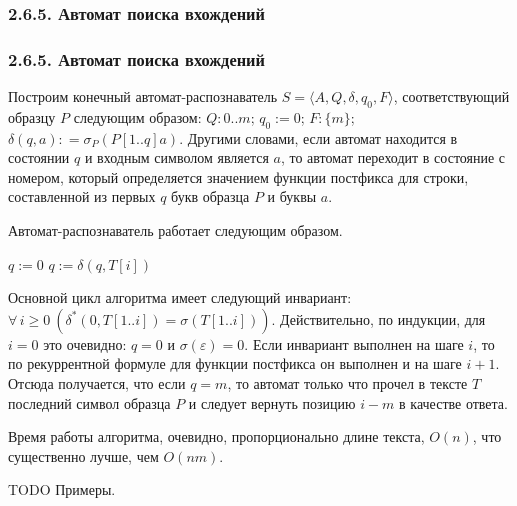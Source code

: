 \documentclass[mathserif,12pt,aspectratio=169]{beamer}
\def\Assign{\operatorname{:=}}
\def\A#1#2{\forall\,#1\ \left(#2\right)}
\let\geq\geqslant
\def\TODO#1{{\color{gray} TODO {#1}}}
\begin{document}
\subsubsection{2.6.5. Автомат поиска вхождений}\label{2.6.5}
\begin{frame}
\frametitle{2.6.5. Автомат поиска вхождений }
Построим конечный автомат-распознаватель $S=\langle A, Q, \delta,
q_0, F\rangle$, соответствующий образцу $P$ следующим образом: $Q:
0..m$; $q_0:= 0$; $F: \{m\}$; $\delta(q,a): = \sigma_P
(P[1..q] a)$. Другими словами, если автомат находится в
состоянии $q$ и входным символом является $a$,  то автомат
переходит  в состояние с номером, который определяется значением
функции постфикса для строки, составленной из первых $q$ букв
образца $P$  и буквы $a$.

Автомат-распознаватель работает следующим образом.

\begin{algorithmic}
 \STATE $q\Assign 0$
   \STATE $q\Assign \delta(q, T[i])$
   \ENDIF
 \ENDFOR
\end{algorithmic}

\begin{ground}
Основной цикл алгоритма имеет следующий инвариант: $\A{i\geq
0}{\delta^* (0, T[1..i])= \sigma (T[1..i])}$. Действительно,
по индукции, для $i=0$ это очевидно: $q=0$ и
$\sigma(\varepsilon)=0$. Если инвариант выполнен на шаге $i$, то
по рекуррентной формуле для функции постфикса
он выполнен и на шаге $i+1$. Отсюда получается, что
если $q=m$, то автомат только что прочел в тексте $T$ последний
символ образца $P$ и следует вернуть позицию $i-m$ в качестве
ответа.
\end{ground}

Время работы алгоритма, очевидно, пропорционально
длине текста, $O(n)$,  что существенно лучше, чем $O(nm)$.

\TODO{Примеры.}
\end{frame}
\end{document}

